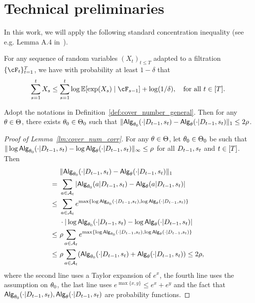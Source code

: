 



\section{Technical preliminaries}


In this work, we will apply the following standard concentration inequality (see e.g. Lemma A.4 in~\cite{foster2021statistical}).
\begin{lemma}\label{lm:exp_concen}
    For any sequence of random variables $(X_t)_{t\leq T}$ adapted to a filtration $\{\cF_{t}\}_{t=1}^T$, we have with probability at least $1-\delta$ that
    \begin{align*}
        \sum_{s=1}^t X_s\leq \sum_{s=1}^t\log\E[\exp(X_s)\mid\cF_{s-1}]+\log(1/\delta),~~~\text{for all } t\in[T].
    \end{align*}
\end{lemma}


\begin{lemma}\label{lm:cover_num_corr}
   Adopt the notations in Definition~\ref{def:cover_number_general}. Then for any ${\theta}\in{\Theta}$, there exists ${\theta}_0\in{\Theta}_0$ such that $\| {\mathsf{Alg}}_{{\theta}_0}(\cdot|{D}_{t-1},{s}_t)-{\mathsf{Alg}}_{{\theta}}(\cdot|{D}_{t-1},{s}_t)\|_{1}\leq 2\rho$. 
\end{lemma}



\begin{proof}[Proof of Lemma~\ref{lm:cover_num_corr}]
For any ${\theta}\in{\Theta}$, let ${\theta}_0\in{\Theta}_0$ be such that $\|\log {\mathsf{Alg}}_{{\theta}_0}(\cdot|{D}_{t-1},{s}_t)-\log {\mathsf{Alg}}_{{\theta}}(\cdot|{D}_{t-1},{s}_t)\|_{\infty}\leq\rho$ for all ${D}_{t-1},{s}_t$ and $t\in[{T}]$. Then
\begin{align*}
   &~\| {\mathsf{Alg}}_{{\theta}_0}(\cdot|{D}_{t-1},{s}_t)-{\mathsf{Alg}}_{{\theta}}(\cdot|{D}_{t-1},{s}_t)\|_{1}\\
   =&~
   \sum_{{a}\in{\mathcal{A}}_t}|{\mathsf{Alg}}_{{\theta}_0}({a}|{D}_{t-1},{s}_t)-{\mathsf{Alg}}_{{\theta}}({a}|{D}_{t-1},{s}_t)|\\
   \leq &~
   \sum_{{a}\in{\mathcal{A}}_t}e^{\max\{\log{\mathsf{Alg}}_{{\theta}_0}(\cdot|{D}_{t-1},{s}_t),\log{\mathsf{Alg}}_{{\theta}}(\cdot|{D}_{t-1},{s}_t)\}}\\
   &~\cdot|\log{\mathsf{Alg}}_{{\theta}_0}(\cdot|{D}_{t-1},{s}_t)-\log{\mathsf{Alg}}_{{\theta}}(\cdot|{D}_{t-1},{s}_t)|\\
   \leq&~\rho \sum_{{a}\in{\mathcal{A}}_t}e^{\max\{\log{\mathsf{Alg}}_{{\theta}_0}(\cdot|{D}_{t-1},{s}_t),\log{\mathsf{Alg}}_{{\theta}}(\cdot|{D}_{t-1},{s}_t)\}}\\
   \leq&~ \rho \sum_{{a}\in{\mathcal{A}}_t} ({\mathsf{Alg}}_{{\theta}_0}(\cdot|{D}_{t-1},{s}_t)+{\mathsf{Alg}}_{{\theta}}(\cdot|{D}_{t-1},{s}_t))\leq 2\rho,
\end{align*}
where the second line uses a Taylor expansion of $e^x$, the fourth line uses the assumption on ${\theta}_0$, the last line uses $e^{\max\{x,y\}}\leq e^x+e^y$ and the fact that ${\mathsf{Alg}}_{{\theta}_0}(\cdot|{D}_{t-1},{s}_t),{\mathsf{Alg}}_{{\theta}}(\cdot|{D}_{t-1},{s}_t)$ are probability functions.
\end{proof}


